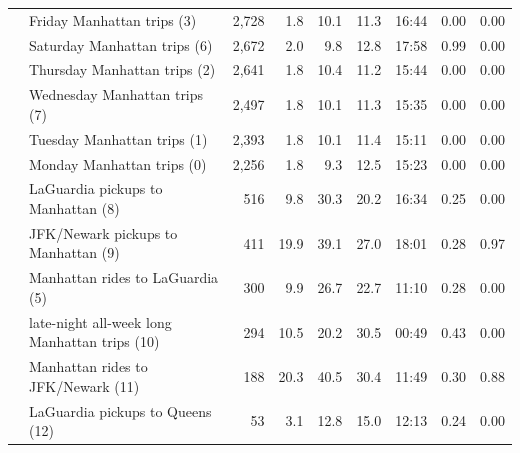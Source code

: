 \documentclass{article}
\begin{document}
\begin{table}[!htbp]
\begin{tabular}{llrrrrrrr}
     & Friday Manhattan trips (3) & 2,728 & 1.8 & 10.1 & 11.3 & 16:44 & 0.00 & 0.00 \\
     & Saturday Manhattan trips (6) & 2,672 & 2.0 & 9.8 & 12.8 & 17:58 & 0.99 & 0.00 \\
     & Thursday Manhattan trips (2) & 2,641 & 1.8 & 10.4 & 11.2 & 15:44 & 0.00 & 0.00 \\
     & Wednesday Manhattan trips (7) & 2,497 & 1.8 & 10.1 & 11.3 & 15:35 & 0.00 & 0.00 \\
     & Tuesday Manhattan trips (1) & 2,393 & 1.8 & 10.1 & 11.4 & 15:11 & 0.00 & 0.00 \\
     & Monday Manhattan trips (0) & 2,256 & 1.8 & 9.3 & 12.5 & 15:23 & 0.00 & 0.00 \\
     & LaGuardia pickups to Manhattan (8) & 516 & 9.8 & 30.3 & 20.2 & 16:34 & 0.25 & 0.00 \\
     & JFK/Newark pickups to Manhattan (9) & 411 & 19.9 & 39.1 & 27.0 & 18:01 & 0.28 & 0.97 \\
     & Manhattan rides to LaGuardia (5) & 300 & 9.9 & 26.7 & 22.7 & 11:10 & 0.28 & 0.00 \\
     & late-night all-week long Manhattan trips (10) & 294 & 10.5 & 20.2 & 30.5 & 00:49 & 0.43 & 0.00 \\
     & Manhattan rides to JFK/Newark (11) & 188 & 20.3 & 40.5 & 30.4 & 11:49 & 0.30 & 0.88 \\
     & LaGuardia pickups to Queens (12) & 53 & 3.1 & 12.8 & 15.0 & 12:13 & 0.24 & 0.00 \\
    \bottomrule
  \end{tabular}
\end{table}
\end{document}
